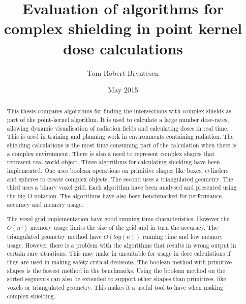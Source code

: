 \documentclass[11pt,twoside,a4paper]{report}
\begin{document}

\title{Evaluation of algorithms for complex shielding in point kernel dose calculations}
\author{Tom Robert Bryntesen}
\date{May 2015}
\maketitle

\begin{abstract}
This thesis compares algorithms for finding the intersections with complex shields as part of the point-kernel algorithm. It is used to calculate a large number dose-rates, allowing dynamic visualisation of radiation fields and calculating doses in real time. This is used in training and planning work in environments containing radiation. The shielding calculations is the most time consuming part of the calculation when there is a complex environment. There is also a need to represent complex shapes that represent real world object. Three algorithms for calculating shielding have been implemented. One uses boolean operations on primitive shapes like boxes, cylinders and spheres to create complex objects. The second uses a triangulated geometry. The third uses a binary voxel grid. Each algorithm have been analysed and presented using the big O notation. The algorithms have also been benchmarked for performance, accuracy and memory usage. 

The voxel grid implementation have good running time characteristics. However the $O(n^3)$ memory usage limits the size of the grid and in turn the accuracy. The triangulated geometry method have $O(log(n))$ running time and low memory usage. However there is a problem with the algorithms that results in wrong output in certain rare situations. This may make in unsuitable for usage in dose calculations if they are used in making safety critical decisions. The boolean method with primitive shapes is the fastest method in the benchmarks. Using the boolean method on the sorted segments can also be extended to support other shapes than primitives, like voxels or triangulated geometry. This makes it a useful tool to have when making complex shielding.
\end{abstract}
\end{document}
